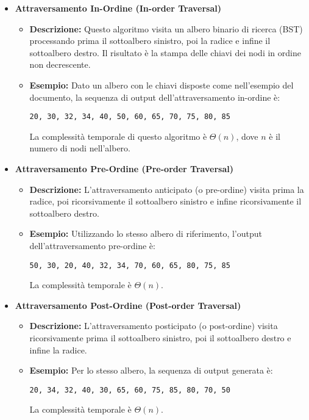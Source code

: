 


\begin{itemize}
    \item \textbf{Attraversamento In-Ordine (In-order Traversal)}
    \begin{itemize}
        \item \textbf{Descrizione:} Questo algoritmo visita un albero binario di ricerca (BST) processando prima il sottoalbero sinistro, poi la radice e infine il sottoalbero destro. Il risultato è la stampa delle chiavi dei nodi in ordine non decrescente.

        \item \textbf{Esempio:} Dato un albero con le chiavi disposte come nell'esempio del documento, la sequenza di output dell'attraversamento in-ordine è:
        \begin{verbatim}
20, 30, 32, 34, 40, 50, 60, 65, 70, 75, 80, 85
        \end{verbatim}
        La complessità temporale di questo algoritmo è $\Theta(n)$, dove $n$ è il numero di nodi nell'albero.
    \end{itemize}

    \item \textbf{Attraversamento Pre-Ordine (Pre-order Traversal)}
    \begin{itemize}
        \item \textbf{Descrizione:} L'attraversamento anticipato (o pre-ordine) visita prima la radice, poi ricorsivamente il sottoalbero sinistro e infine ricorsivamente il sottoalbero destro.

        \item \textbf{Esempio:} Utilizzando lo stesso albero di riferimento, l'output dell'attraversamento pre-ordine è:
        \begin{verbatim}
50, 30, 20, 40, 32, 34, 70, 60, 65, 80, 75, 85
        \end{verbatim}
        La complessità temporale è $\Theta(n)$.
    \end{itemize}

    \item \textbf{Attraversamento Post-Ordine (Post-order Traversal)}
    \begin{itemize}
        \item \textbf{Descrizione:} L'attraversamento posticipato (o post-ordine) visita ricorsivamente prima il sottoalbero sinistro, poi il sottoalbero destro e infine la radice.

        \item \textbf{Esempio:} Per lo stesso albero, la sequenza di output generata è:
        \begin{verbatim}
20, 34, 32, 40, 30, 65, 60, 75, 85, 80, 70, 50
        \end{verbatim}
        La complessità temporale è $\Theta(n)$.
    \end{itemize}


\end{itemize}
